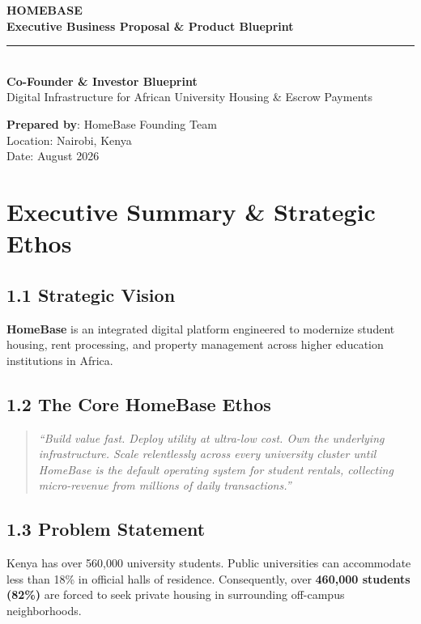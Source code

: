 \documentclass[11pt,a4paper]{article}
\begin{document}
\begin{titlepage}
    \centering
    \vspace*{2cm}
    
    {\Huge \bfseries \color{primary} HOMEBASE} \\[0.75em]
    {\Large \bfseries Executive Business Proposal \& Product Blueprint} \\[1.5em]
    
    \rule{0.8\textwidth}{1.5pt} \\[2em]
    
    {\large \textbf{Co-Founder \& Investor Blueprint}} \\[0.5em]
    {\small Digital Infrastructure for African University Housing \& Escrow Payments} \\[4cm]
    
    \vfill
    
    {\large \textbf{Prepared by}: HomeBase Founding Team} \\
    {\small Location: Nairobi, Kenya} \\
    {\small Date: August 2026}
\end{titlepage}

\newpage

\section{Executive Summary \& Strategic Ethos}

\subsection{1.1 Strategic Vision}
\textbf{HomeBase} is an integrated digital platform engineered to modernize student housing, rent processing, and property management across higher education institutions in Africa.

\subsection{1.2 The Core HomeBase Ethos}
\begin{quote}
\textit{“Build value fast. Deploy utility at ultra-low cost. Own the underlying infrastructure. Scale relentlessly across every university cluster until HomeBase is the default operating system for student rentals, collecting micro-revenue from millions of daily transactions.”}
\end{quote}

\subsection{1.3 Problem Statement}
Kenya has over 560,000 university students. Public universities can accommodate less than 18\% in official halls of residence. Consequently, over \textbf{460,000 students (82\%)} are forced to seek private housing in surrounding off-campus neighborhoods. 
\end{document}
